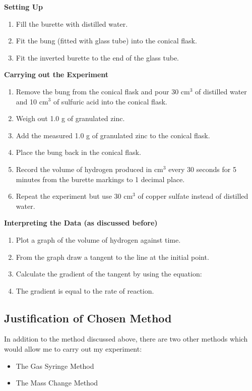 \textbf{Setting Up}

\begin{enumerate}
\item Fill the burette with distilled water.
\item Fit the bung (fitted with glass tube) into the conical flask.
\item Fit the inverted burette to the end of the glass tube.
\end{enumerate}

\textbf{Carrying out the Experiment}

\begin{enumerate}
\item Remove the bung from the conical flask and pour 30 cm$^3$ of distilled water and 10 cm$^3$ of sulfuric acid into the conical flask.
\item Weigh out 1.0 g of granulated zinc.
\item Add the measured 1.0 g of granulated zinc to the conical flask.
\item Place the bung back in the conical flask.
\item Record the volume of hydrogen produced in cm$^3$ every 30 seconds for 5 minutes from the burette markings to 1 decimal place.
\item Repeat the experiment but use 30 cm$^3$ of copper sulfate instead of distilled water.
\end{enumerate} 

\textbf{Interpreting the Data (as discussed before)}

\begin{enumerate}
\item Plot a graph of the volume of hydrogen against time.
\item From the graph draw a tangent to the line at the initial point.
\item Calculate the gradient of the tangent by using the equation: 
\item The gradient is equal to the rate of reaction.
\end{enumerate}



	\subsection{Justification of Chosen Method}

In addition to the method discussed above, there are two other methods which would allow me to carry out my experiment:
\begin{itemize}
\item The Gas Syringe Method
\item The Mass Change Method 
\end{itemize}

